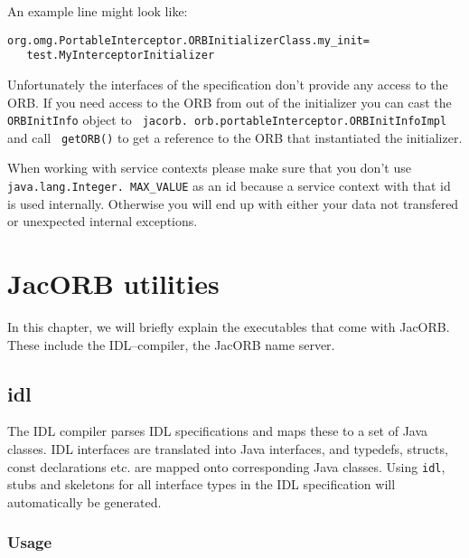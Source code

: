\documentclass[12pt]{scrbook}
\begin{document}
An example line might look like:
\begin{verbatim}org.omg.PortableInterceptor.ORBInitializerClass.my_init=  
   test.MyInterceptorInitializer
\end{verbatim}

Unfortunately the  interfaces of  the specification don't  provide any
access to  the ORB.  If  you need  access to the  ORB from out  of the
initializer  you  can  cast  the  {\tt  ORBInitInfo}  object  to  {\tt
jacorb. orb.portableInterceptor.ORBInitInfoImpl}   and   call  {\tt
getORB()}  to  get  a  reference  to the  ORB  that  instantiated  the
initializer.

When working with service contexts please make sure that you don't use
{\tt  java.lang.Integer. MAX\_VALUE}  as an  id  because a  service
context with  that id  is used internally.  Otherwise you will  end up
with  either   your  data   not  transfered  or   unexpected  internal
exceptions.



\chapter{JacORB utilities}

In this chapter, we will briefly explain the executables that come
with JacORB. These include the IDL--compiler, the JacORB name server.


\section{idl}

The IDL compiler parses IDL specifications  and maps these to a set of
Java classes. IDL interfaces  are translated into Java interfaces, and
typedefs,   structs,   const  declarations   etc.   are  mapped   onto
corresponding Java  classes.  Using {\tt idl},  stubs and
skeletons  for  all interface  types  in  the  IDL specification  will
automatically be generated.

\subsection*{Usage}

\end{document}
